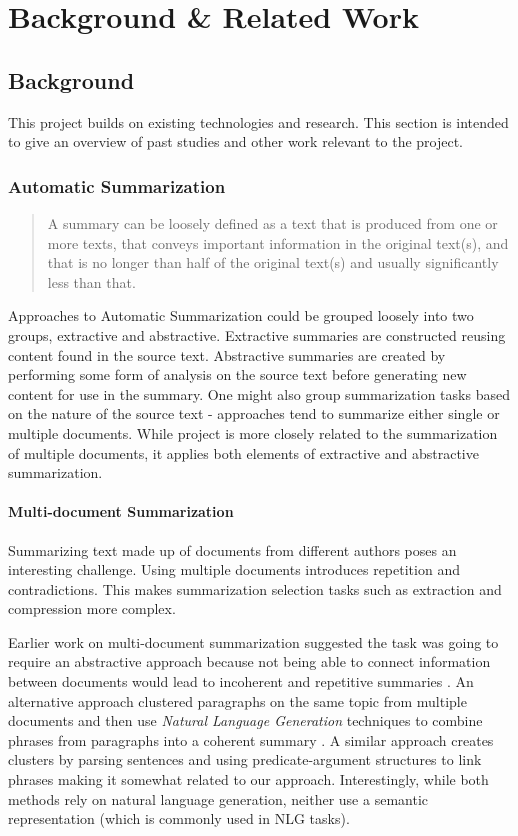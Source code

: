 \chapter{Background \& Related Work\label{chap:background-related}}
  \section{Background}
    This project builds on existing technologies and research. This section is intended to give an overview of past studies and other work relevant to the project.

    \tocless\subsection{Automatic Summarization}
      \blockquote{A summary can be loosely defined as a text that is produced from one or more texts, that conveys important information in the original text(s), and that is no longer than half of the original text(s) and usually significantly less than that.} \cite{radev2002introduction}

      Approaches to Automatic Summarization could be grouped loosely into two groups, extractive and abstractive. Extractive summaries are constructed reusing content found in the source text. Abstractive summaries are created by performing some form of analysis on the source text before generating new content for use in the summary. One might also group summarization tasks based on the nature of the source text - approaches tend to summarize either single or multiple documents. While project is more closely related to the summarization of multiple documents, it applies both elements of extractive and abstractive summarization.

      \subsubsection{Multi-document Summarization}
        Summarizing text made up of documents from different authors poses an interesting challenge. Using multiple documents introduces repetition and contradictions. This makes summarization selection tasks such as extraction and compression more complex.

        Earlier work on multi-document summarization suggested the task was going to require an abstractive approach because not being able to connect information between documents would lead to incoherent and repetitive summaries \cite{McKeown1999TMS315149315355}. An alternative approach clustered paragraphs on the same topic from multiple documents and then use \textit{Natural Language Generation} techniques to combine phrases from paragraphs into a coherent summary \cite{McKeown1999TMS315149315355}. A similar approach creates clusters by parsing sentences and using predicate-argument structures to link phrases \cite{barzilay1999information} making it somewhat related to our approach. Interestingly, while both methods rely on natural language generation, neither use a semantic representation (which is commonly used in NLG tasks).

